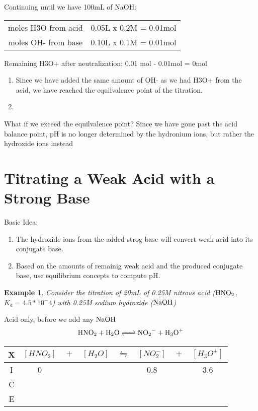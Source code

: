 \documentclass{article}  %
\newtheorem{exmp}{Example}
\begin{document}
Continuing until we have 100mL of NaOH:
\newline
\begin{tabular}{ c c }
    moles H3O from acid & 0.05L x 0.2M = 0.01mol \\
    moles OH- from base & 0.10L x 0.1M = 0.01mol \\
\end{tabular}
\newline
Remaining H3O+ after neutralization: 0.01 mol - 0.01mol = 0mol \\
\begin{enumerate}
    \item Since we have added the same amount of OH- as we had H3O+ from the acid, we have reached the equilvalence point of the titration.
    \item 
\end{enumerate}

What if we exceed the equilvalence point? 
\newline
Since we have gone past the acid balance point, pH is no longer determined by the hydronium ions, but rather the hydroxide ions instead

\section*{Titrating a Weak Acid with a Strong Base}
Basic Idea:
\begin{enumerate}
    \item The hydroxide ions from the added strog base will convert weak acid into its conjugate base.
    \item Based on the amounts of remainig weak acid and the produced conjugate base, use equilibrium concepts to compute pH.
\end{enumerate}

\begin{exmp}
    Consider the titration of 20mL of 0.25M nitrous acid ($\ce{HNO2}$, $K_a = 4.5*10^-4$) with 0.25M sodium hydroxide ($\ce{NaOH}$)
\end{exmp}
Acid only, before we add any $\ce{NaOH}$
\begin{equation*}
    \begin{aligned}
        \ce{HNO2 + H2O <=> NO2- + H3O+}
    \end{aligned}
\end{equation*}
\newline
\begin{tabular}{c|c@{}c@{}c@{}c@{}c@{}c@{}c}
    \hline
    X   & $[HNO_2]$ & ${}+{}$ & $[H_2O]$ & ${}\leftrightharpoons{}$ & $[NO_2^-]$ & ${}+{}$ & $[H_3O^+]$ \\
    \hline
    I   &  0   &&     &&  0.8   && 3.6  \\
    C   &      &&     &&     &&   \\
    E   &      &&     &&     &&   \\      
\end{tabular}
\newline
\end{document}
